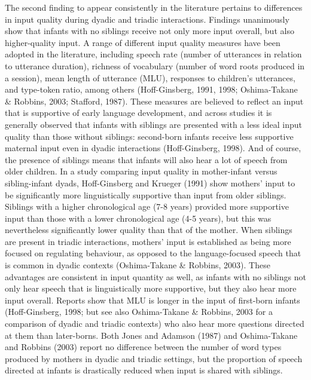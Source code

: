 \documentclass[man,floatsintext]{apa6}
\begin{document}
The second finding to appear consistently in the literature pertains to differences in input quality during dyadic and triadic interactions. Findings unanimously show that infants with no siblings receive not only more input overall, but also higher-quality input. A range of different input quality measures have been adopted in the literature, including speech rate (number of utterances in relation to utterance duration), richness of vocabulary (number of word roots produced in a session), mean length of utterance (MLU), responses to children's utterances, and type-token ratio, among others (Hoff-Ginsberg, 1991, 1998; Oshima-Takane \& Robbins, 2003; Stafford, 1987). These measures are believed to reflect an input that is supportive of early language development, and across studies it is generally observed that infants with siblings are presented with a less ideal input quality than those without siblings: second-born infants receive less supportive maternal input even in dyadic interactions (Hoff-Ginsberg, 1998). And of course, the presence of siblings means that infants will also hear a lot of speech from older children. In a study comparing input quality in mother-infant versus sibling-infant dyads, Hoff-Ginsberg and Krueger (1991) show mothers' input to be significantly more linguistically supportive than input from older siblings. Siblings with a higher chronological age (7-8 years) provided more supportive input than those with a lower chronological age (4-5 years), but this was nevertheless significantly lower quality than that of the mother. When siblings are present in triadic interactions, mothers' input is established as being more focused on regulating behaviour, as opposed to the language-focused speech that is common in dyadic contexts (Oshima-Takane \& Robbins, 2003). These advantages are consistent in input quantity as well, as infants with no siblings not only hear speech that is linguistically more supportive, but they also hear more input overall. Reports show that MLU is longer in the input of first-born infants (Hoff-Ginsberg, 1998; but see also Oshima-Takane \& Robbins, 2003 for a comparison of dyadic and triadic contexts) who also hear more questions directed at them than later-borns. Both Jones and Adamson (1987) and Oshima-Takane and Robbins (2003) report no difference between the number of word types produced by mothers in dyadic and triadic settings, but the proportion of speech directed at infants is drastically reduced when input is shared with siblings.
\end{document}
